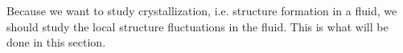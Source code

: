 \documentclass[thesis]{subfiles}
\begin{document}
Because we want to study crystallization, i.e. structure formation in a fluid, we should study the local structure fluctuations in the fluid. This is what will be done in this section.

%
%
%
\end{document}

